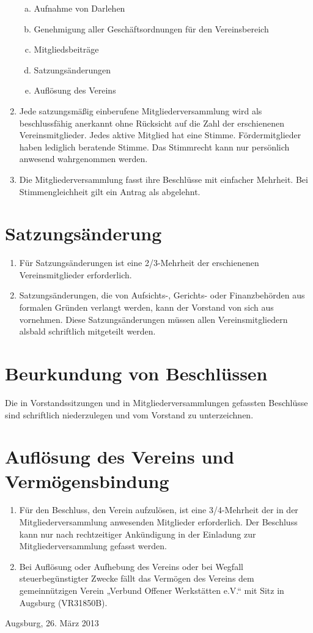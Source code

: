 \documentclass[a5paper, ngerman, 10pt]{scrreprt}
\begin{document}
\begin{enumerate}[(1)]
\begin{enumerate}[a.]
        \item Aufnahme von Darlehen
        \item Genehmigung aller Geschäftsordnungen für den Vereinsbereich
        \item Mitgliedsbeiträge
        \item Satzungsänderungen
        \item Auflösung des Vereins
    \end{enumerate}
    \item Jede satzungsmäßig einberufene Mitgliederversammlung wird als
        beschlussfähig anerkannt ohne Rücksicht auf die Zahl der erschienenen
        Vereinsmitglieder. Jedes aktive Mitglied hat eine Stimme.
        Fördermitglieder haben lediglich beratende Stimme. Das Stimmrecht kann
        nur persönlich anwesend wahrgenommen werden.
    \item Die Mitgliederversammlung fasst ihre Beschlüsse mit einfacher
        Mehrheit.  Bei Stimmengleichheit gilt ein Antrag als abgelehnt.
\end{enumerate}


\section{Satzungsänderung}
\begin{enumerate}[(1)]
    \item Für Satzungsänderungen ist eine 2/3-Mehrheit der erschienenen
        Vereinsmitglieder erforderlich.
    \item Satzungsänderungen, die von Aufsichts-, Gerichts- oder Finanzbehörden
        aus formalen Gründen verlangt werden, kann der Vorstand von sich aus
        vornehmen. Diese Satzungsänderungen müssen allen Vereinsmitgliedern
        alsbald schriftlich mitgeteilt werden.
\end{enumerate}


\section{Beurkundung von Beschlüssen}
Die in Vorstandssitzungen und in Mitgliederversammlungen gefassten Beschlüsse
sind schriftlich niederzulegen und vom Vorstand zu unterzeichnen.


\section{Auflösung des Vereins und Vermögensbindung}
\begin{enumerate}[(1)]
    \item Für den Beschluss, den Verein aufzulösen, ist eine 3/4-Mehrheit der
        in der Mitgliederversammlung anwesenden Mitglieder erforderlich. Der
        Beschluss kann nur nach rechtzeitiger Ankündigung in der Einladung zur
        Mitgliederversammlung gefasst werden.
    \item Bei Auflösung oder Aufhebung des Vereins oder bei Wegfall
        steuerbegünstigter Zwecke fällt das Vermögen des Vereins dem
        gemeinnützigen Verein „Verbund Offener Werkstätten e.V.“ mit Sitz in
        Augsburg (VR31850B).
\end{enumerate}

\vspace{\fill}
Augsburg, 26. März 2013
\end{document}
